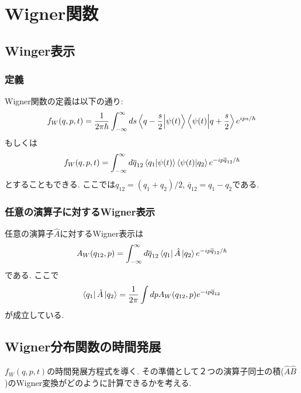 \documentclass[10.5pt,a4paper]{jreport}
\begin{document}
\chapter{Wigner関数}
\section{Winger表示}
\subsection{定義}
Wigner関数の定義は以下の通り:
\begin{eqnarray}
  f_W(q, p, t) = \frac{1}{2\pi\hbar}\int_{-\infty}^{\infty} ds \bra{q-\frac{s}{2}}\ket{\psi(t)}\bra{\psi(t)}\ket{q+\frac{s}{2}}e^{ips/\hbar}\label{wigner1}
\end{eqnarray}
もしくは
\begin{eqnarray}
  f_W(q, p, t) = \int_{-\infty}^{\infty} d\overline{q}_{12} \bra{q_1}\ket{\psi(t)}\bra{\psi(t)}\ket{q_2}e^{-ip\overline{q}_{12}/\hbar}\label{wigner2}
\end{eqnarray}
とすることもできる. ここでは$q_{12} = (q_1 + q_2)/2$, $\overline{q}_{12} = q_1 - q_2$である.

\subsection{任意の演算子に対するWigner表示}
任意の演算子$\hat{A}$に対するWigner表示は
\begin{eqnarray}
  A_W(q_{12}, p) = \int_{-\infty}^{\infty} d\overline{q}_{12} \bra{q_1}\hat{A}\ket{q_2}e^{-ip\overline{q}_{12}/\hbar}\label{wigner_op}
\end{eqnarray}
である. ここで
\begin{eqnarray}
  \bra{q_1}\hat{A}\ket{q_2} = \frac{1}{2\pi}\int dp A_W(q_{12}, p)e^{-ip\overline{q}_{12}}\label{wigner_formula}
\end{eqnarray}
が成立している.
\section{Wigner分布関数の時間発展}
$f_W(q, p, t)$の時間発展方程式を導く. その準備として２つの演算子同士の積($\hat{A}\hat{B}$)のWigner変換がどのように計算できるかを考える. 
\end{document}
